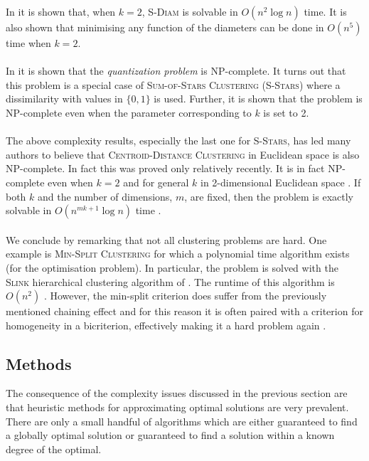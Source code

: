In \citet{hansen87sumofdiameters} it is shown that, when $k=2$,
\textsc{S-Diam} is solvable in $O(n^2 \log n)$ time.  It is also shown that
minimising any function of the diameters can be done in $O(n^5)$ time when
$k=2$.
\\\\
\noindent In \citet{garey82quant} it is shown that the \textit{quantization
  problem} is NP-complete.  It turns out that this problem is a special case
of \textsc{Sum-of-Stars Clustering} (\textsc{S-Stars}) where a dissimilarity
with values in $\{0,1\}$ is used.  Further, it is shown that the problem is
NP-complete even when the parameter corresponding to $k$ is set to 2.
\\\\
\noindent The above complexity results, especially the last one for
\textsc{S-Stars}, has led many authors to believe that
\textsc{Centroid-Distance Clustering} in Euclidean space is also NP-complete.
In fact this was proved only relatively recently.  It is in fact NP-complete
even when $k=2$ \citep{aloise09exact} and for general $k$ in 2-dimensional
Euclidean space \citep{mahajan09}.  If both $k$ and the number of dimensions,
$m$, are fixed, then the problem is exactly solvable in $O(n^{mk+1} \log n)$
time \citep{inaba94weightedvoronoi}.
\\\\
\noindent We conclude by remarking that not all clustering problems are hard.
One example is \textsc{Min-Split Clustering} for which a polynomial time
algorithm exists (for the optimisation problem).  In particular, the problem
is solved with the \textsc{Slink} hierarchical clustering algorithm of
\citet{johnson67hierarchical}.  The runtime of this algorithm is $O(n^2)$
\citep{delattre1980bicriterion}.  However, the min-split criterion does suffer
from the previously mentioned chaining effect and for this reason it is often
paired with a criterion for homogeneity in a bicriterion, effectively making
it a hard problem again \citep{delattre1980bicriterion}.

\subsection{Methods}
\label{sec:methods}

The consequence of the complexity issues discussed in the previous section are
that heuristic methods for approximating optimal solutions are very
prevalent.  There are only a small handful of algorithms which are either
guaranteed to find a globally optimal solution or guaranteed to find a
solution within a known degree of the optimal.

